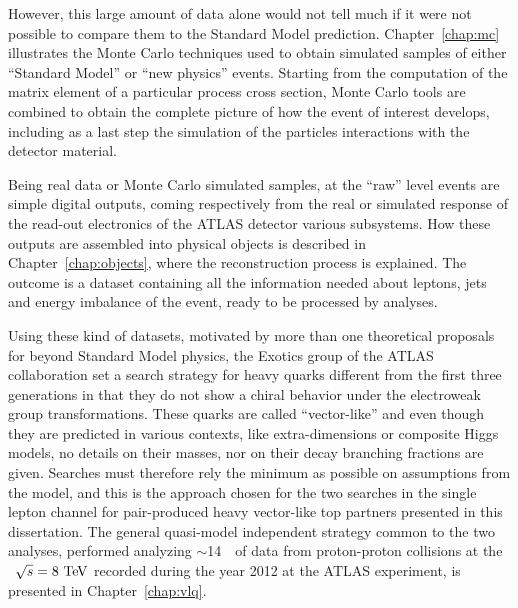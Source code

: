 However, this large amount of data alone would 
not tell much if it were not possible to
compare them to the Standard Model prediction.
Chapter~\ref{chap:mc} illustrates the Monte Carlo techniques used
to obtain simulated samples of either ``Standard Model'' %
or ``new physics'' events. 
Starting from the computation of the matrix element of a 
particular process cross section, Monte Carlo tools
are combined to obtain the complete picture of how the
event of interest develops, including as a last step
the simulation of the particles interactions with the
detector material.

Being real data or Monte Carlo simulated samples, at
the ``raw'' level events are simple digital outputs, coming respectively
from the real or simulated response of the read-out electronics
of the ATLAS detector various subsystems. How these outputs
are assembled into physical objects is described in Chapter~\ref{chap:objects},
where the reconstruction process is explained.
The outcome is a dataset containing all the information needed
about leptons, jets and energy imbalance of the event,
ready to be processed by analyses.


Using these kind of datasets, motivated by more than 
one theoretical proposals for beyond Standard Model
physics, the Exotics group of the ATLAS collaboration set a search strategy 
for heavy quarks different from the first three generations in that they
do not show a chiral behavior under the electroweak group transformations.
These quarks are called ``vector-like'' and even though they are
predicted in various contexts, like extra-dimensions or composite Higgs
models, no details on their masses, nor on their decay branching fractions
are given. Searches must therefore rely the minimum as possible on 
assumptions from the model, and this is the approach chosen for the
two searches in the single lepton channel
for pair-produced heavy vector-like top partners 
presented in this dissertation. The general quasi-model independent
strategy common to the two analyses, performed analyzing 
$\sim$14~\ifb\ of data from proton-proton collisions at the
 \cme\ $\rts=8\tev$ recorded during the year 2012 
at the ATLAS experiment, is presented in
Chapter~\ref{chap:vlq}.

